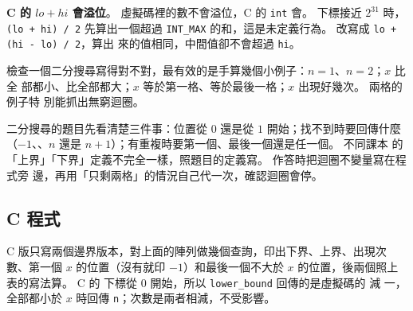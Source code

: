\textbf{C 的 $\mathit{lo} + \mathit{hi}$ 會溢位}。 虛擬碼裡的數不會溢位，C 的
\texttt{int} 會。 下標接近 $2^{31}$ 時，\texttt{(lo + hi) / 2} 先算出一個超過
\texttt{INT\_MAX} 的和，這是未定義行為。 改寫成 \texttt{lo + (hi - lo) / 2}，算出
來的值相同，中間值卻不會超過 \texttt{hi}。

檢查一個二分搜尋寫得對不對，最有效的是手算幾個小例子：$n = 1$、$n = 2$；$x$ 比全
部都小、比全部都大；$x$ 等於第一格、等於最後一格；$x$ 出現好幾次。 兩格的例子特
別能抓出無窮迴圈。

\begin{examnote}
二分搜尋的題目先看清楚三件事：位置從 $0$ 還是從 $1$ 開始；找不到時要回傳什麼
（$-1$、\NIL、$n$ 還是 $n + 1$）；有重複時要第一個、最後一個還是任一個。 不同課本
的「上界」「下界」定義不完全一樣，照題目的定義寫。 作答時把迴圈不變量寫在程式旁
邊，再用「只剩兩格」的情況自己代一次，確認迴圈會停。
\end{examnote}

\subsection{C 程式}

C 版只寫兩個邊界版本，對上面的陣列做幾個查詢，印出下界、上界、出現次數、第一個
$x$ 的位置（沒有就印 $-1$）和最後一個不大於 $x$ 的位置，後兩個照上表的寫法算。 C 的
下標從 $0$ 開始，所以 \texttt{lower\_bound} 回傳的是虛擬碼的  減
一，全部都小於 $x$ 時回傳 \texttt{n}；次數是兩者相減，不受影響。


